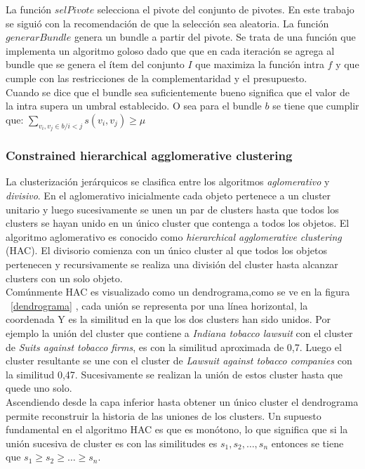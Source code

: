 La función $selPivote$ selecciona el pivote del conjunto de pivotes. En este trabajo se siguió con la recomendación de \cite{newSimilarity} que la selección sea aleatoria. La función $generarBundle$ genera un bundle a partir del pivote. Se trata de una función que implementa un algoritmo goloso dado que que en cada iteración se agrega al bundle que se genera el ítem del conjunto $I$ que maximiza la función intra $f$ y que cumple con las restricciones de la complementaridad y el presupuesto.\\
Cuando se dice que el bundle sea suficientemente bueno significa que el valor de la intra supera un umbral establecido. O sea para el bundle $b$ se tiene que cumplir que: $\sum_{v_i, v_j \in b / i < j}{s(v_i,v_j)} \geq \mu$\\

\subsubsection{Constrained hierarchical agglomerative clustering}
La clusterización jerárquicos se clasifica entre los algoritmos \textit{aglomerativo} y \textit{divisivo}. En el aglomerativo inicialmente cada objeto pertenece a un cluster unitario y luego sucesivamente se unen un par de clusters hasta que todos los clusters se hayan unido en un único cluster que contenga a todos los objetos. El algoritmo aglomerativo es conocido como \textit{hierarchical agglomerative clustering} (HAC). El divisorio comienza con un único cluster al que todos los objetos pertenecen y recursivamente se realiza una división del cluster hasta alcanzar clusters con un solo objeto.\\
Comúnmente HAC es visualizado como un dendrograma,como se ve en la figura ~\ref{dendrograma} , cada unión se representa por una línea horizontal, la coordenada Y es la similitud en la que los dos clusters han sido unidos. Por ejemplo la unión del cluster que contiene a \textit{Indiana tobacco lawsuit} con el cluster de \textit{Suits against tobacco firms}, es con la similitud aproximada de 0,7. Luego el cluster resultante se une con el cluster de \textit{Lawsuit against tobacco companies} con la similitud 0,47. Sucesivamente se realizan la unión de estos cluster hasta que quede uno solo.\\
Ascendiendo desde la capa inferior hasta obtener un único cluster el dendrograma permite reconstruir la historia de las uniones de los clusters. Un supuesto fundamental en el algoritmo HAC es que es monótono, lo que significa que si la unión sucesiva de cluster es con las similitudes es $s_1,s_2,\ldots,s_n$ entonces se tiene que $s_1 \geq s_2 \geq \ldots \geq s_n$.\\


